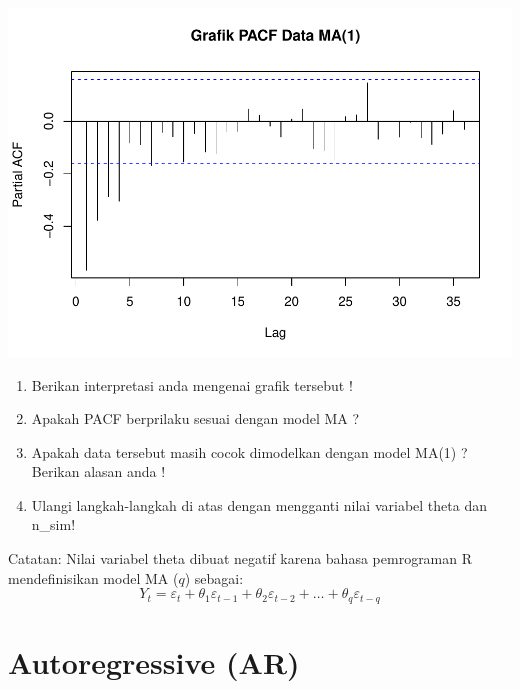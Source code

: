 \documentclass[
]{book}
\begin{document}
\begin{center}\includegraphics{_main_files/figure-latex/pacf MA-1} \end{center}
\begin{jp}{}{}
\begin{enumerate}
\item Berikan interpretasi anda mengenai grafik tersebut !  
\item Apakah PACF berprilaku sesuai dengan model MA ?
\item Apakah data tersebut masih cocok dimodelkan dengan model MA(1) ? Berikan alasan anda !
\item Ulangi langkah-langkah di atas dengan mengganti nilai variabel theta dan n\_sim!
\end{enumerate}
\end{jp}

Catatan: Nilai variabel theta dibuat negatif karena bahasa pemrograman R mendefinisikan model MA (\(q\)) sebagai:
\begin{equation}
Y_t=\varepsilon_t + \theta_1 \varepsilon_{t-1} + \theta_2 \varepsilon_{t-2} + \dots + \theta_q \varepsilon_{t-q}
\end{equation}

\hypertarget{autoregressive-ar}{%
\section{Autoregressive (AR)}\label{autoregressive-ar}}
\end{document}
